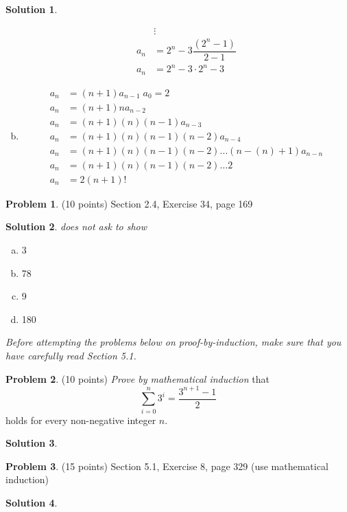 \documentclass{article}
\theoremstyle{definition}
\newtheorem{problem}{Problem}
\newtheorem*{solution}{Solution}
\begin{document}
\begin{solution}
\begin{enumerate}[a)]
\begin{align*}
    &\vdots \\
    a_n &= 2^n - 3\dfrac{(2^n - 1)}{2-1} \\
    a_n &= 2^n -3 \cdot 2^n - 3
  \end{align*}
  \item 
  \begin{align*}
        a_n &= (n+1)a_{n-1} \; a_0 = 2 \\
    a_n &= (n+1)n a_{n-2} \\
    a_n &= (n+1)(n)(n-1) a_{n-3} \\
    a_n &= (n+1)(n)(n-1)(n-2) a_{n-4} \\
    a_n &= (n+1)(n)(n-1)(n-2) \dots (n-(n) + 1)  a_{n-n} \\
    a_n &= (n+1)(n)(n-1)(n-2) \dots 2 \\
    a_n &= 2(n+1)!
  \end{align*}
  
\end{enumerate}
\end{solution}

\begin{problem} (10 points)
Section 2.4, Exercise 34, page 169
\end{problem}
\begin{solution} \textit{does not ask to show}
\begin{enumerate}[a)]
  \item 3
  \item 78
  \item 9
  \item 180
\end{enumerate}
\end{solution}

\noindent
\textsl{Before attempting the problems below on proof-by-induction, make sure that 
you have carefully read Section 5.1.}

\begin{problem} (10 points) \textsl{Prove by mathematical induction} that
$$\sum_{i=0}^n 3^i = \frac{3^{n+1}-1}{2}$$
holds for every non-negative integer $n$.
\end{problem}
\begin{solution}
\end{solution}

\begin{problem} (15 points)
Section 5.1, Exercise 8, page 329 (use mathematical induction)
\end{problem}
\begin{solution} 
\end{solution}
\end{document}
